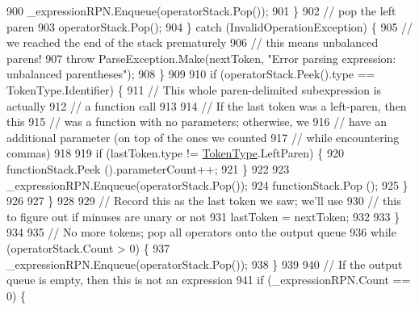 \begin{DoxyCode}
900                                 \_expressionRPN.Enqueue(operatorStack.Pop());
901                             \}
902                             \textcolor{comment}{// pop the left paren}
903                             operatorStack.Pop();
904                         \} \textcolor{keywordflow}{catch} (InvalidOperationException) \{
905                             \textcolor{comment}{// we reached the end of the stack prematurely}
906                             \textcolor{comment}{// this means unbalanced parens!}
907                             \textcolor{keywordflow}{throw} ParseException.Make(nextToken, \textcolor{stringliteral}{"Error parsing expression: unbalanced
       parentheses"});
908                         \}
909 
910                         \textcolor{keywordflow}{if} (operatorStack.Peek().type == TokenType.Identifier) \{
911                             \textcolor{comment}{// This whole paren-delimited subexpression is actually}
912                             \textcolor{comment}{// a function call}
913 
914                             \textcolor{comment}{// If the last token was a left-paren, then this}
915                             \textcolor{comment}{// was a function with no parameters; otherwise, we }
916                             \textcolor{comment}{// have an additional parameter (on top of the ones we counted}
917                             \textcolor{comment}{// while encountering commas)}
918 
919                             \textcolor{keywordflow}{if} (lastToken.type != \hyperlink{a00026_a301aa7c866593a5b625a8fc158bbeace}{TokenType}.LeftParen) \{
920                                 functionStack.Peek ().parameterCount++;
921                             \}
922 
923                             \_expressionRPN.Enqueue(operatorStack.Pop());
924                             functionStack.Pop ();
925                         \}
926 
927                     \}
928 
929                     \textcolor{comment}{// Record this as the last token we saw; we'll use}
930                     \textcolor{comment}{// this to figure out if minuses are unary or not}
931                     lastToken = nextToken;
932 
933                 \}
934 
935                 \textcolor{comment}{// No more tokens; pop all operators onto the output queue}
936                 \textcolor{keywordflow}{while} (operatorStack.Count > 0) \{
937                     \_expressionRPN.Enqueue(operatorStack.Pop());
938                 \}
939 
940                 \textcolor{comment}{// If the output queue is empty, then this is not an expression}
941                 \textcolor{keywordflow}{if} (\_expressionRPN.Count == 0) \{

\end{DoxyCode}
